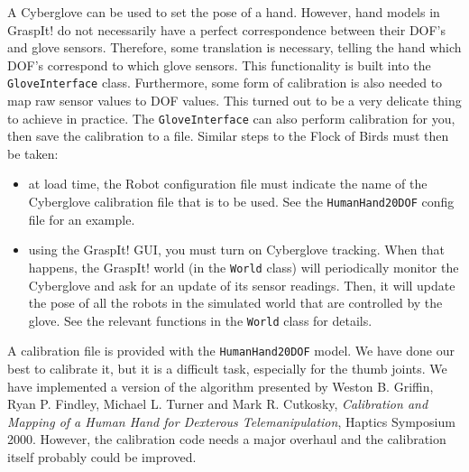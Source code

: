 A Cyberglove can be used to set the pose of a hand. However, hand
models in GraspIt! do not necessarily have a perfect correspondence
between their DOF's and glove sensors. Therefore, some translation is
necessary, telling the hand which DOF's correspond to which glove
sensors. This functionality is built into the \texttt{GloveInterface}
class. Furthermore, some form of calibration is also needed to map raw
sensor values to DOF values. This turned out to be a very delicate
thing to achieve in practice. The \texttt{GloveInterface} can also
perform calibration for you, then save the calibration to a
file. Similar steps to the Flock of Birds must then be taken:
\begin{itemize}
\item at load time, the Robot configuration file must indicate the
  name of the Cyberglove calibration file that is to be used. See the
  \texttt{HumanHand20DOF} config file for an example.
\item using the GraspIt! GUI, you must turn on Cyberglove
  tracking. When that happens, the GraspIt! world (in the
  \texttt{World} class) will periodically monitor the Cyberglove and
  ask for an update of its sensor readings. Then, it will update the
  pose of all the robots in the simulated world that are controlled by
  the glove. See the relevant functions in the \texttt{World} class
  for details.
\end{itemize}

A calibration file is provided with the \texttt{HumanHand20DOF}
model. We have done our best to calibrate it, but it is a difficult
task, especially for the thumb joints. We have implemented a version
of the algorithm presented by Weston B. Griffin, Ryan P. Findley,
Michael L. Turner and Mark R. Cutkosky, \textit{Calibration and
  Mapping of a Human Hand for Dexterous Telemanipulation}, Haptics
Symposium 2000. However, the calibration code needs a major overhaul
and the calibration itself probably could be improved.
